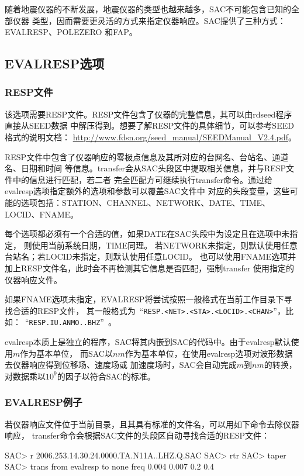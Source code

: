 随着地震仪器的不断发展，地震仪器的类型也越来越多，SAC不可能包含已知的全部仪器
类型，因而需要更灵活的方式来指定仪器响应。SAC提供了三种方式：EVALRESP、POLEZERO
和FAP。

\subsection{EVALRESP选项}
\subsubsection{RESP文件}
该选项需要RESP文件。RESP文件包含了仪器的完整信息，其可以由rdseed程序直接从SEED数据
中解压得到。想要了解RESP文件的具体细节，可以参考SEED格式的说明文档：
\url{http://www.fdsn.org/seed_manual/SEEDManual_V2.4.pdf}。

RESP文件中包含了仪器响应的零极点信息及其所对应的台网名、台站名、通道名、日期和时间
等信息。transfer会从SAC头段区中提取相关信息，并与RESP文件中的信息进行匹配，若二者
完全匹配方可继续执行transfer命令。通过给evalresp选项指定额外的选项和参数可以覆盖SAC文件中
对应的头段变量，这些可能的选项包括：STATION、CHANNEL、NETWORK、DATE、TIME、LOCID、FNAME。

每个选项都必须有一个合适的值，如果DATE在SAC头段中为设定且在选项中未指定，
则使用当前系统日期，TIME同理。
若NETWORK未指定，则默认使用任意台站名；若LOCID未指定，则默认使用任意LOCID。
也可以使用FNAME选项并加上RESP文件名，此时会不再检测其它信息是否匹配，强制transfer
使用指定的仪器响应文件。

如果FNAME选项未指定，EVALRESP将尝试按照一般格式在当前工作目录下寻找合适的RESP文件，
其一般格式为~``\verb+RESP.<NET>.<STA>.<LOCID>.<CHAN>+''，比如：~``\verb+RESP.IU.ANMO..BHZ+''~。

evalresp本质上是独立的程序，SAC将其内嵌到SAC的代码中。由于evalresp默认使用$m$作为基本单位，
而SAC以$nm$作为基本单位，在使用evalresp选项对波形数据去仪器响应得到位移场、速度场或
加速度场时，SAC会自动完成$m$到$nm$的转换，对数据乘以$10^9$的因子以符合SAC的标准。

\subsubsection{EVALRESP例子}
若仪器响应文件位于当前目录，且其具有标准的文件名，可以用如下命令去除仪器响应，
transfer命令会根据SAC文件的头段区自动寻找合适的RESP文件：
\begin{SACCode}
SAC> r 2006.253.14.30.24.0000.TA.N11A..LHZ.Q.SAC
SAC> rtr
SAC> taper
SAC> trans from evalresp to none freq 0.004 0.007 0.2 0.4
\end{SACCode}

